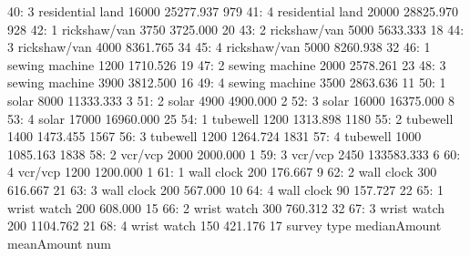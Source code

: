 \begin{Schunk}
\begin{Soutput}
40:      3      residential land        16000  25277.937  979
41:      4      residential land        20000  28825.970  928
42:      1          rickshaw/van         3750   3725.000   20
43:      2          rickshaw/van         5000   5633.333   18
44:      3          rickshaw/van         4000   8361.765   34
45:      4          rickshaw/van         5000   8260.938   32
46:      1        sewing machine         1200   1710.526   19
47:      2        sewing machine         2000   2578.261   23
48:      3        sewing machine         3900   3812.500   16
49:      4        sewing machine         3500   2863.636   11
50:      1                 solar         8000  11333.333    3
51:      2                 solar         4900   4900.000    2
52:      3                 solar        16000  16375.000    8
53:      4                 solar        17000  16960.000   25
54:      1              tubewell         1200   1313.898 1180
55:      2              tubewell         1400   1473.455 1567
56:      3              tubewell         1200   1264.724 1831
57:      4              tubewell         1000   1085.163 1838
58:      2               vcr/vcp         2000   2000.000    1
59:      3               vcr/vcp         2450 133583.333    6
60:      4               vcr/vcp         1200   1200.000    1
61:      1            wall clock          200    176.667    9
62:      2            wall clock          300    616.667   21
63:      3            wall clock          200    567.000   10
64:      4            wall clock           90    157.727   22
65:      1           wrist watch          200    608.000   15
66:      2           wrist watch          300    760.312   32
67:      3           wrist watch          200   1104.762   21
68:      4           wrist watch          150    421.176   17
    survey                  type medianAmount meanAmount  num
\end{Soutput}
\end{Schunk}

